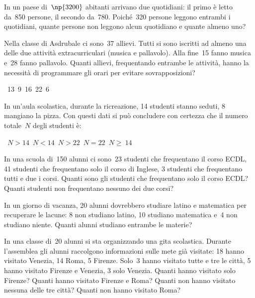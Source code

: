 \begin{multicols}{2}
\begin{esercizio}
\label{ese:\thechapter.86}
In un paese di~$\np{3200}$ abitanti arrivano due quotidiani: il primo è letto da~850
persone, il secondo da~780. Poiché~320 persone leggono entrambi i
quotidiani, quante persone non leggono alcun quotidiano e quante almeno uno?
\end{esercizio}

\begin{esercizio}
\label{ese:\thechapter.87}
Nella classe di Asdrubale ci sono~37 allievi. Tutti si sono iscritti
ad almeno una delle due attività extracurriculari (musica e
pallavolo). Alla fine~15 fanno musica e~28 fanno pallavolo.
Quanti allievi, frequentando entrambe le attività, hanno la
necessità di programmare gli orari per evitare sovrapposizioni?
\begin{center}
 \boxA~13\quad\boxB~9\quad\boxC~16\quad\boxD~22\quad\boxE~6
\end{center}
\end{esercizio}

\begin{esercizio}
\label{ese:\thechapter.88}
In un'aula scolastica, durante la ricreazione, 14
studenti stanno seduti, 8 mangiano la pizza. Con questi dati si può
concludere con certezza che il numero totale~$N$ degli studenti è:
\begin{center}
 \boxA\quad~$N>14$\quad\boxB\quad~$N<14$\quad\boxC\quad~$N>22$\quad\boxD\quad~$N = 22$\quad\boxE\quad~$N\ge~14$
\end{center}
\end{esercizio}

\begin{esercizio}
\label{ese:\thechapter.89}
In una scuola di~150 alunni ci sono~23 studenti che frequentano il corso ECDL, 41 studenti che frequentano solo il corso di Inglese, 3
studenti che frequentano tutti e due i corsi. Quanti sono gli studenti che frequentano solo il corso ECDL? Quanti studenti non frequentano
nessuno dei due corsi?
\end{esercizio}

\begin{esercizio}
\label{ese:\thechapter.90}
In un giorno di vacanza, 20 alunni dovrebbero studiare latino e
matematica per recuperare le lacune: 8 non studiano latino, 10 studiano
matematica e~4 non studiano niente. Quanti alunni studiano entrambe le
materie?
\end{esercizio}

\begin{esercizio}
\label{ese:\thechapter.91}
In una classe di~20 alunni si sta organizzando una gita
scolastica. Durante l'assemblea gli alunni raccolgono
informazioni sulle mete già visitate: 18 hanno visitato Venezia, 14
Roma, 5 Firenze. Solo~3 hanno visitato tutte e tre le città, 5 hanno
visitato Firenze e Venezia, 3 solo Venezia. Quanti hanno visitato solo
Firenze? Quanti hanno visitato Firenze e Roma? Quanti non hanno
visitato nessuna delle tre città? Quanti non hanno visitato Roma?
\end{esercizio}
\end{multicols}
